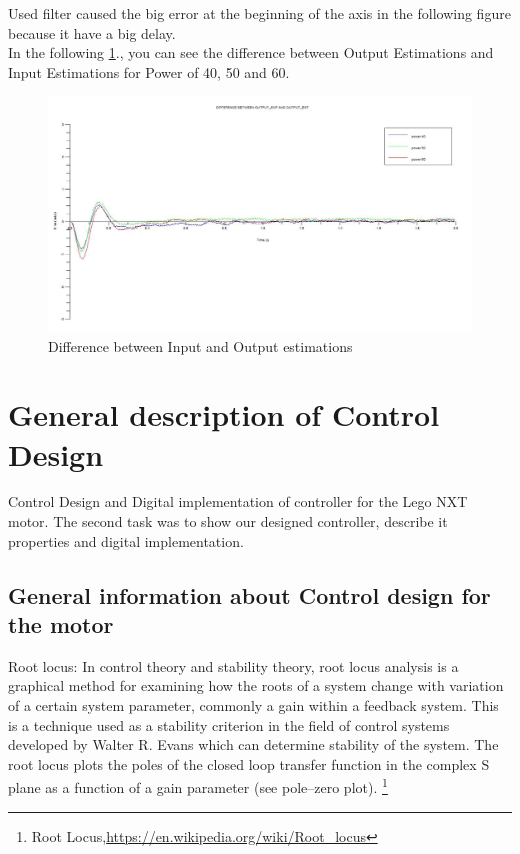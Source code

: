\documentclass[a4paper,12pt,oneside]{article}
\begin{document}
\begin{enumerate}
Used filter caused the big error at the beginning of the axis in the following figure because it have a big delay.
\\
In the following \cref{fig:D13}., you can see the difference between Output Estimations and Input Estimations for Power of 40, 50 and 60. \\
\begin{figure}[h]%
	\centering
	\includegraphics[keepaspectratio=true, width=15cm]{D13.jpg}
	\caption{Difference between Input and Output estimations}%
	\label{fig:D13}%
\end{figure}

\section{General description of Control Design}
Control Design and Digital implementation of controller for the Lego NXT motor.
The second task was to show our designed controller, describe it properties and digital implementation.
\subsection {General information about Control design for the motor}

Root locus: In control theory and stability theory, root locus analysis is a graphical method for examining how the roots of a system change with variation of a certain system parameter, commonly a gain within a feedback system. This is a technique used as a stability criterion in the field of control systems developed by Walter R. Evans which can determine stability of the system. The root locus plots the poles of the closed loop transfer function in the complex S plane as a function of a gain parameter (see pole–zero plot). \footnote{Root Locus,\url{https://en.wikipedia.org/wiki/Root_locus}} \\


\end{enumerate}
\end{document}
